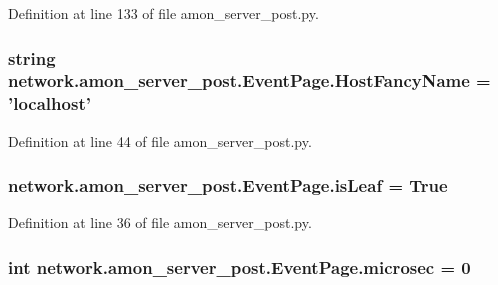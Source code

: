 Definition at line 133 of file amon\-\_\-server\-\_\-post.\-py.

\hypertarget{classnetwork_1_1amon__server__post_1_1_event_page_ab2d4c291eb38394dd80dc0da415bc8f7}{
\subsubsection[{Host\-Fancy\-Name}]{\setlength{\rightskip}{0pt plus 5cm}string network.\-amon\-\_\-server\-\_\-post.\-Event\-Page.\-Host\-Fancy\-Name = 'localhost'\hspace{0.3cm}{\ttfamily [static]}}}\label{classnetwork_1_1amon__server__post_1_1_event_page_ab2d4c291eb38394dd80dc0da415bc8f7}


Definition at line 44 of file amon\-\_\-server\-\_\-post.\-py.

\hypertarget{classnetwork_1_1amon__server__post_1_1_event_page_a2c4039685dcc225adc4c2a998ebdbc97}{
\subsubsection[{is\-Leaf}]{\setlength{\rightskip}{0pt plus 5cm}network.\-amon\-\_\-server\-\_\-post.\-Event\-Page.\-is\-Leaf = True\hspace{0.3cm}{\ttfamily [static]}}}\label{classnetwork_1_1amon__server__post_1_1_event_page_a2c4039685dcc225adc4c2a998ebdbc97}


Definition at line 36 of file amon\-\_\-server\-\_\-post.\-py.

\hypertarget{classnetwork_1_1amon__server__post_1_1_event_page_ac1ec0da9b3424978570e5327b65cbbcc}{
\subsubsection[{microsec}]{\setlength{\rightskip}{0pt plus 5cm}int network.\-amon\-\_\-server\-\_\-post.\-Event\-Page.\-microsec = 0\hspace{0.3cm}{\ttfamily [static]}}}\label{classnetwork_1_1amon__server__post_1_1_event_page_ac1ec0da9b3424978570e5327b65cbbcc}


